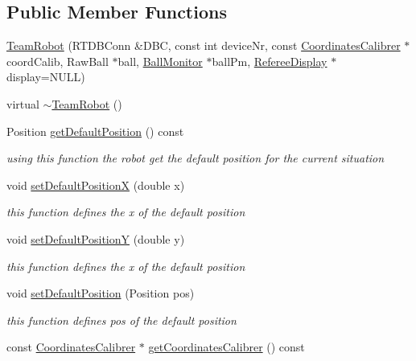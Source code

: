 \subsection*{Public Member Functions}
\begin{DoxyCompactItemize}
\item 
\hyperlink{classTeamRobot_a4b116f58f0a1568a886d03b0c71df20c}{TeamRobot} (RTDBConn \&DBC, const int deviceNr, const \hyperlink{classCoordinatesCalibrer}{CoordinatesCalibrer} $\ast$coordCalib, RawBall $\ast$ball, \hyperlink{classBallMonitor}{BallMonitor} $\ast$ballPm, \hyperlink{classRefereeDisplay}{RefereeDisplay} $\ast$display=NULL)
\item 
virtual \hyperlink{classTeamRobot_a7be9d5161b7524cbbb6ae486ad4a1b42}{$\sim$TeamRobot} ()
\item 
Position \hyperlink{classTeamRobot_acd11ff6d9651a8deddafa5bd9a30865c}{getDefaultPosition} () const 
\begin{DoxyCompactList}\small\item\em using this function the robot get the default position for the current situation \item\end{DoxyCompactList}\item 
void \hyperlink{classTeamRobot_a527cefdb32f2bc0a4fa770207d4dc934}{setDefaultPositionX} (double x)
\begin{DoxyCompactList}\small\item\em this function defines the x of the default position \item\end{DoxyCompactList}\item 
void \hyperlink{classTeamRobot_afeb86cb88b18030049d525d1d6790e6e}{setDefaultPositionY} (double y)
\begin{DoxyCompactList}\small\item\em this function defines the x of the default position \item\end{DoxyCompactList}\item 
void \hyperlink{classTeamRobot_a322f046e260aedff6f2c8edc5730c9ac}{setDefaultPosition} (Position pos)
\begin{DoxyCompactList}\small\item\em this function defines pos of the default position \item\end{DoxyCompactList}\item 
const \hyperlink{classCoordinatesCalibrer}{CoordinatesCalibrer} $\ast$ \hyperlink{classTeamRobot_a3ef7d4538226085ed4d92b8bd2fce67d}{getCoordinatesCalibrer} () const 

\end{DoxyCompactItemize}

